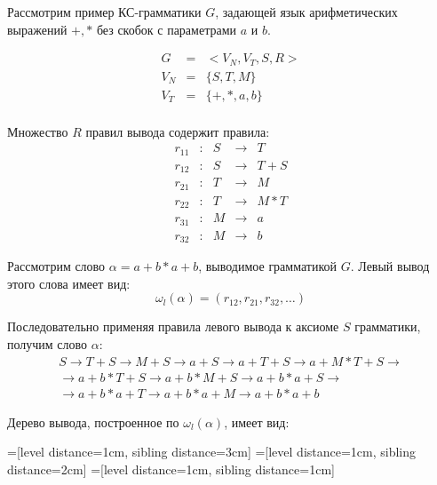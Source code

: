 \documentclass[12pt]{article}
\begin{document}
\begin{footnotesize}
	
Рассмотрим пример КС-грамматики $G$, задающей язык арифметических выражений $+, *$ без скобок с параметрами $a$ и $b$.

\begin{equation}
\begin{array}{lcl}
	G & = & <V_N, V_T, S, R> \\
	V_N & = & \{S, T, M\} \\
	V_T & = & \{+, *, a, b\} \\
\end{array}
\end{equation}

Множество $R$ правил вывода содержит правила:	
\begin{equation}
\begin{array}{lclcl}
	r_{11} & : & S & \rightarrow & T \\
	r_{12} & : & S & \rightarrow & T + S \\
	r_{21} & : & T & \rightarrow & M \\
	r_{22} & : & T & \rightarrow & M * T \\
	r_{31} & : & M & \rightarrow & a \\
	r_{32} & : & M & \rightarrow & b	
\end{array}
\end{equation}

Рассмотрим слово $\alpha = a + b * a + b$, выводимое грамматикой $G$. Левый вывод этого слова имеет вид:
\begin{equation}
	\omega_l(\alpha) = (r_{12}, r_{21}, r_{32}, \ldots)
\end{equation}

Последовательно применяя правила левого вывода к аксиоме $S$ грамматики, получим слово $\alpha$:
\begin{multline}
	S \rightarrow T + S \rightarrow M + S \rightarrow a + S \rightarrow a + T + S \rightarrow a + M * T + S \rightarrow \\
	\rightarrow a + b * T + S \rightarrow a + b * M + S \rightarrow a + b * a + S \rightarrow \\
	\rightarrow a + b * a + T \rightarrow a + b * a + M \rightarrow a + b * a + b
\end{multline}

Дерево вывода, построенное по $\omega_l(\alpha)$, имеет вид:

=[level distance=1cm, sibling distance=3cm]
=[level distance=1cm, sibling distance=2cm]
=[level distance=1cm, sibling distance=1cm]



\end{footnotesize}
\end{document}
